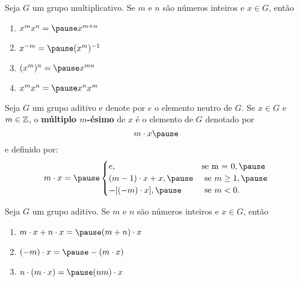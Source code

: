 \documentclass{beamer}
\begin{document}
    \begin{frame}
        \begin{proposicao}
            Seja $G$ um grupo multiplicativo. \pause Se $m$ e $n$ são n\'umeros inteiros \pause e $x \in G$, \pause então \pause
            \begin{enumerate}[label={\roman*})]
                \item $x^mx^n = \pause x^{m + n}$ \pause

                \item $x^{-m} = \pause (x^m)^{-1}$ \pause

                \item $(x^m)^n = \pause x^{mn}$ \pause

                \item $x^mx^n = \pause x^nx^m$
            \end{enumerate}
        \end{proposicao}
    \end{frame}

    \begin{frame}
        Seja $G$ um grupo aditivo \pause e denote por $e$ o elemento neutro de $G$. \pause Se $x \in G$ \pause e $m \in \mathbb{Z}$, \pause o \textbf{m\'ultiplo $m$-ésimo} de $x$ \pause é o elemento de $G$ denotado por \pause
        \[
            m \cdot x \pause
        \]
        e definido por:
        \[
            m \cdot x = \pause \begin{cases}
                    e, & \mbox{se m = 0}, \pause\\
                    (m - 1)\cdot x + x, \pause & \mbox{ se } m \ge 1, \pause\\
                    -[(-m) \cdot x], \pause & \mbox{ se } m < 0.
                   \end{cases}
        \]
    \end{frame}

    \begin{frame}
        \begin{proposicao}
            Seja $G$ um grupo aditivo. \pause Se $m$ e $n$ são n\'umeros inteiros \pause e $x \in G$, então \pause
            \begin{enumerate}[label={\roman*})]
                \item $m \cdot x + n \cdot x = \pause (m + n) \cdot x$ \pause

                \item $(-m) \cdot x = \pause -(m \cdot x)$ \pause

                \item $n\cdot (m \cdot x) = \pause (nm)\cdot x$
            \end{enumerate}
        \end{proposicao}
    \end{frame}
\end{document}
